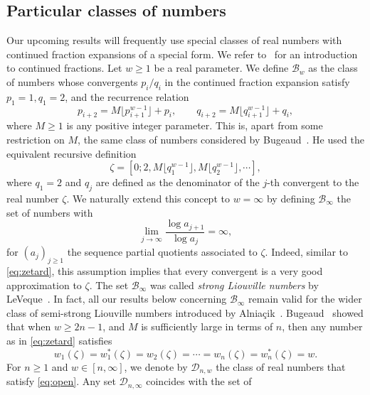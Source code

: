 \documentclass[12pt]{amsart}
\theoremstyle{definition}
\begin{document}
\subsection{Particular classes of numbers}
Our upcoming results 
will frequently use special classes of real numbers with
continued fraction expansions of a special form.
We refer to~\cite[Section~1.2]{bugbuch} for an introduction to continued fractions.
Let $w\geq 1$ be a real parameter.
We define $\mathscr{B}_{w}$ as the class of numbers whose
convergents $p_{i}/q_{i}$ in the continued fraction expansion
satisfy $p_{1}=1, q_{1}=2$, and the recurrence relation 
%
\[
p_{i+2}=M\lfloor p_{i+1}^{w-1}\rfloor+p_{i}, \qquad
q_{i+2}=M\lfloor q_{i+1}^{w-1}\rfloor+q_{i},
\]
%
where $M\geq 1$ is any positive integer parameter. This is,
apart from some restriction on $M$, the same
class of numbers considered by
Bugeaud~\cite{bug}. He used the equivalent recursive definition
%
\begin{equation} \label{eq:zetard}
\zeta=[0;2,M\lfloor q_{1}^{w-1}\rfloor,M\lfloor q_{2}^{w-1}\rfloor,\cdots],
\end{equation}
%
where $q_{1}=2$ and $q_{j}$ are defined as the 
denominator of the $j$-th 
convergent to the real number $\zeta$.
We naturally extend this concept to $w=\infty$ by 
defining $\mathscr{B}_{\infty}$ the set of numbers with
%
\begin{equation} \label{eq:unendlich}
\lim_{j\to\infty} \frac{\log a_{j+1}}{\log a_{j}}= \infty,
\end{equation}
%
for $(a_{j})_{j\geq 1}$ the sequence partial quotients associated 
to $\zeta$. Indeed, similar to \eqref{eq:zetard}, this assumption
implies that every convergent is a very good approximation 
to $\zeta$.
The set $\mathscr{B}_{\infty}$ was called {\em strong Liouville numbers} by LeVeque~\cite{leveque}. In fact, all our results below concerning $\mathscr{B}_{\infty}$ remain valid for the wider class of semi-strong Liouville numbers
introduced by Alnia\c{c}ik~\cite{alni}.
Bugeaud~\cite[Corollary~1]{bug} showed that when $w\geq 2n-1$, 
and $M$ is sufficiently large in terms of $n$, 
then any number as in \eqref{eq:zetard} satisfies
%
\begin{equation} \label{eq:open}
w_{1}(\zeta)=w_{1}^{\ast}(\zeta)=w_{2}(\zeta)=\cdots=w_{n}(\zeta)=w_{n}^{\ast}(\zeta)=w.
\end{equation}
%
For $n\geq 1$ and $w\in[n,\infty]$, we denote by $\mathscr{D}_{n,w}$ the class of real numbers that satisfy \eqref{eq:open}.
Any set $\mathscr{D}_{n,\infty}$ coincides with the set of 
\end{document}
